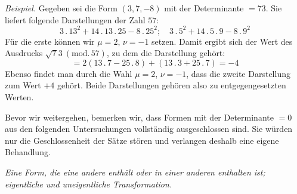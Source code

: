 \textit{Beispiel.} Gegeben sei die Form $(3,7,-8)$ mit der Determinante $=73$. Sie liefert folgende Darstellungen der Zahl $57$:
\[
3\mathbin{.}13^2+14\mathbin{.}13\mathbin{.}25-8\mathbin{.}25^2;\quad
3\mathbin{.}5^2+14\mathbin{.}5\mathbin{.}9-8\mathbin{.}9^2
\]
Für die erste können wir $\mu=2$, $\nu=-1$ setzen. Damit ergibt sich der Wert des Ausdrucks $\surd73\ (\mathrm{mod.}\,57)$, zu dem die Darstellung gehört:
\[
{}=2(13\mathbin{.}7-25\mathbin{.}8)+(13\mathbin{.}3+25\mathbin{.}7)=-4
\]
Ebenso findet man durch die Wahl $\mu=2$, $\nu=-1$, dass die zweite Darstellung zum Wert $+4$ gehört. Beide Darstellungen gehören also zu entgegengesetzten Werten.

Bevor wir weitergehen, bemerken wir, dass Formen mit der Determinante $=0$ aus den folgenden Untersuchungen vollständig ausgeschlossen sind. Sie würden nur die Geschlossenheit der Sätze stören und verlangen deshalb eine eigene Behandlung.

\begin{center}
\textit{Eine Form, die eine andere enthält oder in einer anderen enthalten ist; eigentliche und uneigentliche Transformation.}
\end{center}

